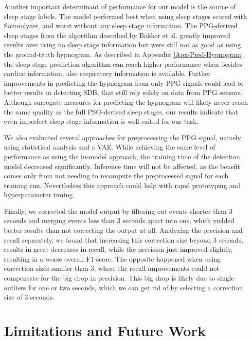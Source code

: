 Another important determinant of performance for our model is the source of sleep stage labels. The model performed best when using sleep stages scored with Somnolyzer, and worst without any sleep stage information. The PPG-derived sleep stages from the algorithm described by Bakker et al. \cite{bakker2021estimating} greatly improved results over using no sleep stage information but were still not as good as using the ground-truth hypnogram. As described in Appendix \ref{Apx-Pred-Hypnogram}, the sleep stage prediction algorithm can reach higher performance when besides cardiac information, also respiratory information is available. Further improvements in predicting the hypnogram from only PPG signals could lead to better results in detecting SDB, that still rely solely on data from PPG sensors.
Although surrogate measures for predicting the hypnogram will likely never reach the same quality as the full PSG-derived sleep stages, our results indicate that even imperfect sleep stage information is well-suited for our task.

We also evaluated several approaches for preprocessing the PPG signal, namely using statistical analysis and a VAE. While achieving the same level of performance as using the in-model approach, the training time of the detection model decreased significantly. Inference time will not be affected, as the benefit comes only from not needing to recompute the preprocessed signal for each training run. Nevertheless this approach could help with rapid prototyping and hyperparameter tuning.

Finally, we corrected the model output by filtering out events shorter than 3 seconds and merging events less than 3 seconds apart into one, which yielded better results than not correcting the output at all.
Analyzing the precision and recall separately, we found that increasing this correction size beyond 3 seconds, results in great decreases in recall, while the precision just improved slightly, resulting in a worse overall F1-score. The opposite happened when using correction sizes smaller than 3, where the recall improvements could not compensate for the big drop in precision. This big drop is likely due to single outliers for one or two seconds, which we can get rid of by selecting a correction size of 3 seconds.

\section{Limitations and Future Work}

